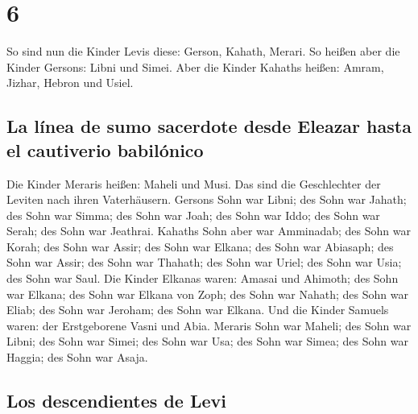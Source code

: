 \hypertarget{section-5}{%
\section{6}\label{section-5}}

 So sind nun die Kinder Levis diese: Gerson, Kahath,
Merari.  So heißen aber die Kinder Gersons: Libni und
Simei.  Aber die Kinder Kahaths heißen: Amram, Jizhar,
Hebron und Usiel.

\hypertarget{la-luxednea-de-sumo-sacerdote-desde-eleazar-hasta-el-cautiverio-babiluxf3nico}{%
\subsection{La línea de sumo sacerdote desde Eleazar hasta el cautiverio
babilónico}\label{la-luxednea-de-sumo-sacerdote-desde-eleazar-hasta-el-cautiverio-babiluxf3nico}}

 Die Kinder Meraris heißen: Maheli und Musi. Das sind die
Geschlechter der Leviten nach ihren Vaterhäusern.  Gersons
Sohn war Libni; des Sohn war Jahath; des Sohn war Simma; 
des Sohn war Joah; des Sohn war Iddo; des Sohn war Serah; des Sohn war
Jeathrai.  Kahaths Sohn aber war Amminadab; des Sohn war
Korah; des Sohn war Assir;  des Sohn war Elkana; des Sohn
war Abiasaph; des Sohn war Assir;  des Sohn war Thahath;
des Sohn war Uriel; des Sohn war Usia; des Sohn war Saul.
 Die Kinder Elkanas waren: Amasai und Ahimoth;
 des Sohn war Elkana; des Sohn war Elkana von Zoph; des
Sohn war Nahath;  des Sohn war Eliab; des Sohn war
Jeroham; des Sohn war Elkana.  Und die Kinder Samuels
waren: der Erstgeborene Vasni und Abia.  Meraris Sohn war
Maheli; des Sohn war Libni; des Sohn war Simei; des Sohn war Usa;
 des Sohn war Simea; des Sohn war Haggia; des Sohn war
Asaja.

\hypertarget{los-descendientes-de-levi}{%
\subsection{Los descendientes de Levi}\label{los-descendientes-de-levi}}


